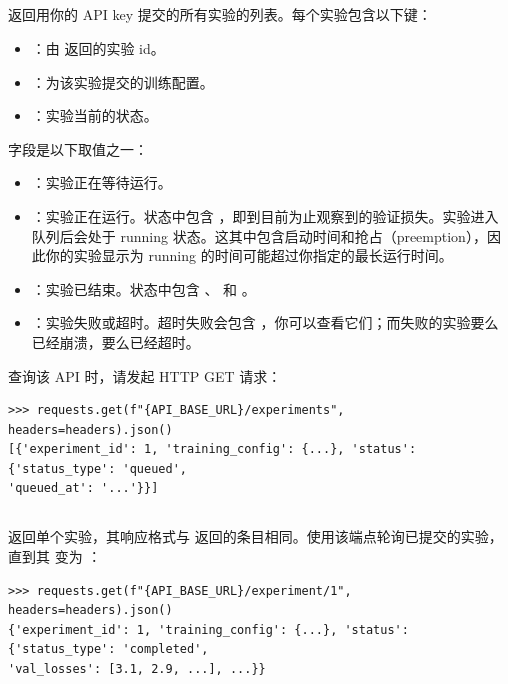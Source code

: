 \subsection*{}

返回用你的 API key 提交的所有实验的列表。每个实验包含以下键：

\begin{itemize}
  \item {}：由  返回的实验 id。
  \item {}：为该实验提交的训练配置。
  \item {}：实验当前的状态。
\end{itemize}

 字段是以下取值之一：

\begin{itemize}
  \item {}：实验正在等待运行。
  \item {}：实验正在运行。状态中包含 ，即到目前为止观察到的验证损失。实验进入队列后会处于 running 状态。这其中包含启动时间和抢占（preemption），因此你的实验显示为 running 的时间可能超过你指定的最长运行时间。
  \item {}：实验已结束。状态中包含 、 和 。
  \item {}：实验失败或超时。超时失败会包含 ，你可以查看它们；而失败的实验要么已经崩溃，要么已经超时。
\end{itemize}

查询该 API 时，请发起 HTTP GET 请求：

\begin{lstlisting}
>>> requests.get(f"{API_BASE_URL}/experiments", headers=headers).json()
[{'experiment_id': 1, 'training_config': {...}, 'status': {'status_type': 'queued',
'queued_at': '...'}}]
\end{lstlisting}

\subsection*{}

返回单个实验，其响应格式与  返回的条目相同。使用该端点轮询已提交的实验，直到其  变为 ：

\begin{lstlisting}
>>> requests.get(f"{API_BASE_URL}/experiment/1", headers=headers).json()
{'experiment_id': 1, 'training_config': {...}, 'status': {'status_type': 'completed',
'val_losses': [3.1, 2.9, ...], ...}}
\end{lstlisting}

